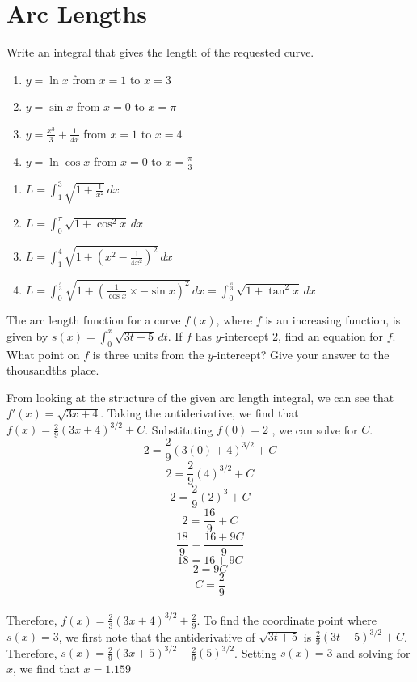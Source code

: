 \chapter{Arc Lengths}
\begin{Exercise}[label=length1]
Write an integral that gives the length of the requested curve.
	\begin{enumerate}
	\item $y = \ln{x}$ from $x = 1$ to $x = 3$
	\item $y = \sin{x}$ from $x = 0$ to $x = \pi$
	\item $y = \frac{x^3}{3} + \frac{1}{4x}$ from $x = 1$ to $x = 4$
	\item $y = \ln{\cos{x}}$ from $x = 0$ to $x = \frac{\pi}{3}$
	\end{enumerate}	 
\end{Exercise}

\begin{Answer}[ref=length1]
	\begin{enumerate}
	\item $L = \int_{1}^{3} \sqrt{1 + \frac{1}{x^2}}\,dx$
	\item $L = \int_{0}^{\pi} \sqrt{1 + \cos^2{x}}\,dx$
	\item $L = \int_{1}^{4} \sqrt{1 + (x^2-\frac{1}{4x^2})^2}\,dx$
	\item $L = \int_{0}^{\frac{\pi}{3}} \sqrt{1 + (\frac{1}{\cos{x}} 
	\times - \sin{x})^2}\,dx = \int_{0}^{\frac{\pi}{3}} \sqrt{1 + 
	\tan^2{x}}\,dx$
	\end{enumerate}
\end{Answer}

\begin{Exercise}[label=length2]
The arc length function for a curve $f(x)$, where $f$ is an increasing 
function, is given by $s(x) = \int_{0}^{x} \sqrt{3t + 5}\,dt$. If $f$ 
has $y$-intercept 2, find an equation for $f$. What point on $f$ is 
three units from the $y$-intercept? Give your answer to the thousandths 
place. 
\end{Exercise}

\begin{Answer}[ref=length2]
From looking at the structure of the given arc length integral, we can 
see that $f'(x) = \sqrt{3x + 4}$. Taking the antiderivative, we find 
that $f(x) = \frac{2}{9}(3x + 4)^{3 / 2} + C$. Substituting $f(0) = 2$
, we can solve for $C$. $$2 = \frac{2}{9}(3(0) + 4)^{3 / 2} + C$$ 
$$2 = \frac{2}{9}(4)^{3 / 2} + C$$ 
$$2 = \frac{2}{9}(2)^3 + C$$ 
$$2 = \frac{16}{9} + C$$ 
$$\frac{18}{9} = \frac{16 + 9C}{9}$$ 
$$18 = 16 + 9C$$ 
$$2 = 9C$$ 
$$C = \frac{2}{9}$$\\ 
Therefore, $f(x) = \frac{2}{3}(3x + 4)^{3 / 2} + \frac{2}{9}$. To find 
the coordinate point where $s(x) = 3$, we first note that the 
antiderivative of $\sqrt{3t + 5}$ is $\frac{2}{9}(3t + 5)^{3 / 2} + C$. 
Therefore, $s(x) = \frac{2}{9}(3x + 5)^{3 / 2} - \frac{2}{9}(5)^{3 / 2}$. 
Setting $s(x) = 3$ and solving for $x$, we find that $x = 1.159$
\end{Answer}

